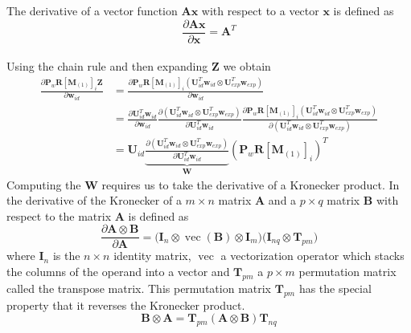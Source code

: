 \documentclass[11pt,a4paper]{report}
\begin{document}
The derivative of a vector function $\mathbf{A}\mathbf{x}$ with respect to a
vector $\mathbf{x}$ is defined as
\begin{equation*}
\frac{\partial \mathbf{A}\mathbf{x}}{\partial \mathbf{x}} = \mathbf{A}^T
\end{equation*}\\
Using the chain rule and then expanding $\mathbf{Z}$ we obtain
\begin{align}
\frac
{\partial 
\mathbf{P}_w\mathbf{R}[\mathbf{M}_{(1)}]_{i}\mathbf{Z}
}
{\partial
\mathbf{w}_{id}
}
&= 
\frac
{\partial
\mathbf{P}_w\mathbf{R}[\mathbf{M}_{(1)}]_{i}(\mathbf{U}_{id}^T\mathbf{w}_{id}
\otimes \mathbf{U}_{exp}^T\mathbf{w}_{exp})
}
{
\partial
\mathbf{w}_{id}
}\nonumber\\
&=
\frac
{\partial
\mathbf{U}_{id}^T\mathbf{w}_{id}
}
{\partial
\mathbf{w}_{id}
}
\frac
{\partial
(\mathbf{U}_{id}^T\mathbf{w}_{id} \otimes \mathbf{U}_{exp}^T\mathbf{w}_{exp})
}
{\partial
\mathbf{U}_{id}^T\mathbf{w}_{id}
}
\frac
{\partial
\mathbf{P}_w\mathbf{R}[\mathbf{M}_{(1)}]_{i}(\mathbf{U}_{id}^T\mathbf{w}_{id} \otimes \mathbf{U}_{exp}^T\mathbf{w}_{exp})
}
{\partial
(\mathbf{U}_{id}^T\mathbf{w}_{id} \otimes \mathbf{U}_{exp}^T\mathbf{w}_{exp})
}\nonumber\\\label{eq:opt0}
&=\mathbf{U}_{id}
\underbrace{
\frac
{\partial
(\mathbf{U}_{id}^T\mathbf{w}_{id} \otimes \mathbf{U}_{exp}^T\mathbf{w}_{exp})
}
{\partial
\mathbf{U}_{id}^T\mathbf{w}_{id}
}
}_{\mathbf{W}}
(\mathbf{P}_w\mathbf{R}[\mathbf{M}_{(1)}]_{i})^T
\end{align}
Computing the $\mathbf{W}$ requires us to take the derivative of a Kronecker
product. In \cite{matcalc} the derivative of the Kronecker of a $m \times n$
matrix $\mathbf{A}$ and a $p \times q$
matrix $\mathbf{B}$ with respect to the
matrix $\mathbf{A}$ is defined as  
\begin{equation}
\frac{\partial \mathbf{A} \otimes \mathbf{B}}{\partial \mathbf{A}} = 
\bigr(\mathbf{I}_{n} \otimes \mathop{vec}(\mathbf{B}) \otimes
\mathbf{I}_{m}\bigl)\bigr(\mathbf{I}_{nq} \otimes \mathbf{T}_{pm}\bigl)
\end{equation}
where $\mathbf{I}_{n}$ is the $n \times n$ identity matrix, $\mathop{vec}$ a
vectorization operator which stacks the columns of the operand into a vector and $\mathbf{T}_{pm}$
a $p \times m$ permutation matrix called the transpose matrix. This permutation matrix $\mathbf{T}_{pm}$ has
the special property that it reverses the Kronecker product.
\begin{equation}
\mathbf{B} \otimes \mathbf{A} = \mathbf{T}_{pm}(\mathbf{A} \otimes
\mathbf{B})\mathbf{T}_{nq}
\end{equation}\\
\end{document}
